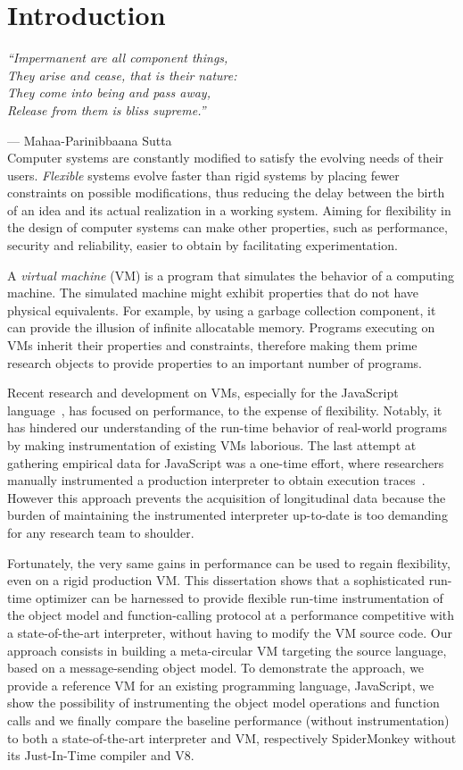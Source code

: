 \chapter{Introduction}

\emph{``Impermanent are all component things,\\
They arise and cease, that is their nature:\\
They come into being and pass away,\\
Release from them is bliss supreme.''} 

--- Mahaa-Parinibbaana Sutta \cite{1988last} \\

Computer systems are constantly modified to satisfy the evolving needs of their
users. \textit{Flexible} systems evolve faster than rigid systems by placing fewer
constraints on possible modifications, thus reducing the delay between the
birth of an idea and its actual realization in a working system. Aiming for
flexibility in the design of computer systems can make other properties, such as
performance, security and reliability, easier to obtain by facilitating
experimentation.

A \textit{virtual machine} (VM) is a program that simulates the behavior of a
computing machine.  The simulated machine might exhibit properties that do not
have physical equivalents. For example, by using a garbage collection
component, it can provide the illusion of infinite allocatable memory. Programs
executing on VMs inherit their properties and constraints, therefore making
them prime research objects to provide properties to an important number of
programs.

Recent research and development on VMs, especially for the JavaScript
language~\cite{js_spec}, has focused on performance, to the expense of
flexibility. Notably, it has hindered our understanding of the run-time
behavior of real-world programs by making instrumentation of existing VMs
laborious. The last attempt at gathering empirical data for JavaScript was a
one-time effort, where researchers manually instrumented a production
interpreter to obtain execution traces~\cite{behavior_js}. However this
approach prevents the acquisition of longitudinal data because the burden of
maintaining the instrumented interpreter up-to-date is too demanding for any
research team to shoulder.

Fortunately, the very same gains in performance can be used to regain
flexibility, even on a rigid production VM. This dissertation shows that a
sophisticated run-time optimizer can be harnessed to provide flexible run-time
instrumentation of the object model and function-calling protocol at a
performance competitive with a state-of-the-art interpreter, without having to
modify the VM source code. Our approach consists in building a meta-circular VM
targeting the source language, based on a message-sending object model. To
demonstrate the approach, we provide a reference VM for an existing programming
language, JavaScript, we show the possibility of instrumenting the object model
operations and function calls and we finally compare the baseline performance
(without instrumentation) to both a state-of-the-art interpreter and VM,
respectively SpiderMonkey without its Just-In-Time compiler and V8.


